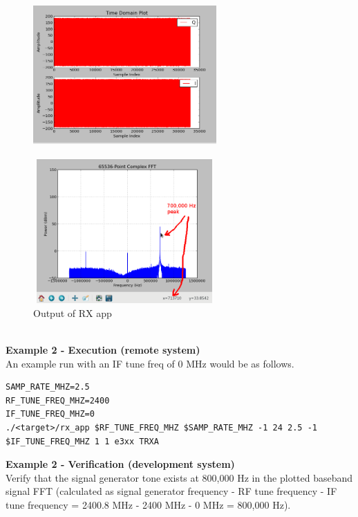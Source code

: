         \begin{figure}[H]
        \begin{minipage}{.5\textwidth}
                \includegraphics[width=7cm,height=5.5cm,keepaspectratio]{rx_app_sig_gen_time_domain}
                \label{fig:rx_app_sig_gen_time_domain}
        \end{minipage}%
        \begin{minipage}{.5\textwidth}
                \includegraphics[width=7cm,height=5.5cm,keepaspectratio]{rx_app_sig_gen_fft}
        \end{minipage}
                \caption{Output of RX app}
                \label{fig:rx_app_sig_gen_fft}
        \end{figure}
\pagebreak
\textbf{\\Example 2 - Execution (remote system)}\\
An example run with an IF tune freq of 0 MHz would be as follows.
\begin{lstlisting}
SAMP_RATE_MHZ=2.5
RF_TUNE_FREQ_MHZ=2400
IF_TUNE_FREQ_MHZ=0
./<target>/rx_app $RF_TUNE_FREQ_MHZ $SAMP_RATE_MHZ -1 24 2.5 -1 $IF_TUNE_FREQ_MHZ 1 1 e3xx TRXA
\end{lstlisting}
\noindent\textbf{Example 2 - Verification (development system)}\\
Verify that the signal generator tone exists at 800,000 Hz in the plotted baseband signal FFT (calculated as signal generator frequency - RF tune frequency - IF tune frequency = 2400.8 MHz - 2400 MHz - 0 MHz = 800,000 Hz).
